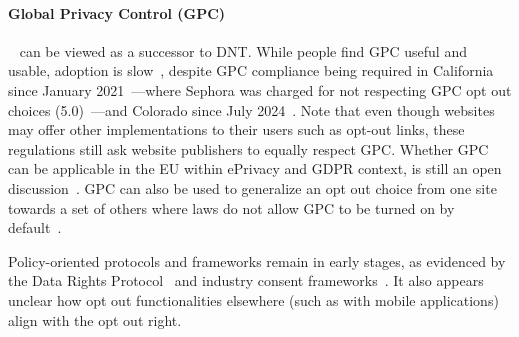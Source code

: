 \paragraph{Global Privacy Control (GPC)}~\cite{zimmeckGlobalPrivacyControl2024} can be viewed as a successor to DNT. While people find GPC useful and usable, adoption is slow~\cite{zimmeckUsabilityEnforceabilityGlobal2023,zimmeckGeneralizableActivePrivacy2024}, despite GPC compliance being required in California since January 2021~\cite{archive-attorneygeneralbecerra[@agbecerra]CCPARequiresBusinesses2021}---where Sephora was charged for not respecting GPC opt out choices (5.0)~\cite{bontaAttorneyGeneralBonta2022}---and Colorado since July 2024~\cite{coloradodepartmentoflawUniversalOptOutShortlist2024}. Note that even though websites may offer other implementations to their users such as opt-out links, these regulations still ask website publishers to equally respect GPC.
Whether GPC can be applicable in the EU within ePrivacy and GDPR context, is still an open discussion~\cite{berjonGPCGDPR2021}. GPC can also be used to generalize an opt out choice from one site towards a set of others where laws do not allow GPC to be turned on by default~\cite{zimmeckGeneralizableActivePrivacy2024}.

Policy-oriented protocols and frameworks remain in early stages, as evidenced by the Data Rights Protocol~\cite{consumerreportsDataRightsProtocol2024} and industry consent frameworks~\cite{iabtechlabGlobalPrivacyPlatform2024}. It also appears unclear how opt out functionalities elsewhere (such as with mobile applications) align with the opt out right.


